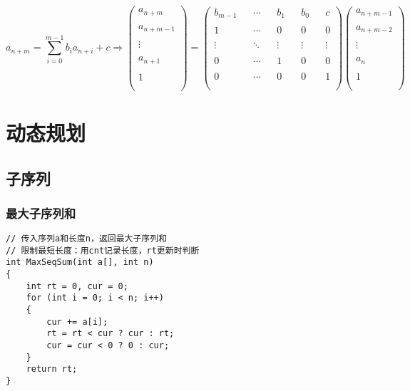 \documentclass[a4]{article}
\begin{document}
\begin{enumerate}
$$
a_{n+m}=\sum_{i=0}^{m-1}b_ia_{n+i}+c\Rightarrow
\left(
\begin{matrix}
 a_{n+m}    \\\\
 a_{n+m-1}  \\\\
 \vdots     \\\\
 a_{n+1}    \\\\
 1          \\\\
\end{matrix}
\right)
=
\left(
\begin{matrix}
 b_{m-1} && \cdots && b_1    && b_0    && c      \\\\
 1       && \cdots && 0      && 0      && 0      \\\\
 \vdots  && \ddots && \vdots && \vdots && \vdots \\\\
 0       && \cdots && 1      && 0      && 0      \\\\
 0       && \cdots && 0      && 0      && 1      \\\\
\end{matrix}
\right)
\left(
\begin{matrix}
 a_{n+m-1} \\\\
 a_{n+m-2} \\\\
 \vdots    \\\\
 a_n       \\\\
 1         \\\\
\end{matrix}
\right)
$$
\end{enumerate}
\clearpage\section{动态规划}
\subsection{子序列}
\subsubsection{最大子序列和}
\begin{lstlisting}
// 传入序列a和长度n，返回最大子序列和
// 限制最短长度：用cnt记录长度，rt更新时判断
int MaxSeqSum(int a[], int n)
{
    int rt = 0, cur = 0;
    for (int i = 0; i < n; i++)
    {
        cur += a[i];
        rt = rt < cur ? cur : rt;
        cur = cur < 0 ? 0 : cur;
    }
    return rt;
}
\end{lstlisting}
\end{document}
